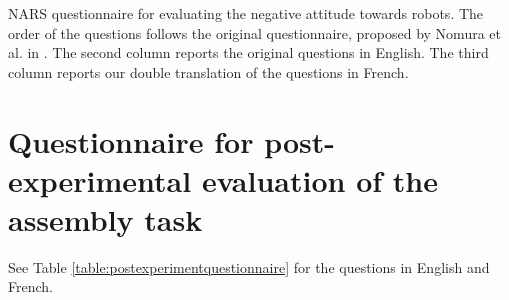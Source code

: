 \begin{table}
\caption{NARS questionnaire for evaluating the negative attitude towards robots. The order of the questions follows the original questionnaire, proposed by Nomura et al. in \cite{Nomura2006nars}. The second column reports the original questions in English. The third column reports our double translation of the questions in French.}
\label{table:nars}
\end{table}



\section{Questionnaire for post-experimental evaluation of the assembly task}\label{appendix:postexpquestionnaire}

See Table \ref{table:postexperimentquestionnaire} for the questions in English and French.

